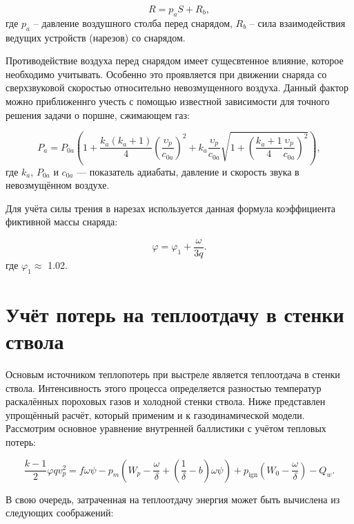 \documentclass[14pt, a4paper]{extreport} %
\begin{document}
\begin{equation}
R = p_a S + R_b,
\end{equation}
где $p_a$ -- давление воздушного столба перед снарядом, $R_b$ -- сила взаимодействия ведущих устройств (нарезов)
со снарядом.

Противодействие воздуха перед снарядом имеет сущесвтенное влияние, которое необходимо учитывать. Особенно это проявляется при движении снаряда 
со сверхзвуковой скоростью относительно невозмущенного воздуха. Данный фактор можно приближеннго учесть с помощью известной зависимости для точного решения задачи о поршне, сжимающем газ:

\begin{equation}
P_a = P_{0a} \left(1 + \frac{k_a(k_a+1)}{4} \left(\frac{\upsilon_p}{c_{0a}}\right)^2 + 
k_a \frac{\upsilon_p}{c_{0a}} \sqrt{1 + \left(\frac{k_a+1}{4} \frac{\upsilon_p}{c_{0a}}\right)^2} \right),
\end{equation}
где $k_a$, $P_{0a}$ и $c_{0a}$ — показатель адиабаты, давление и скорость звука в невозмущённом воздухе.

Для учёта силы трения в нарезах используется данная формула коэффициента фиктивной массы снаряда: 

\begin{equation}
\varphi = \varphi_1 + \frac{\omega}{3q}.
\label{eq:phi_equation}
\end{equation}
где $\varphi_1 \approx$  1.02.

\section{Учёт потерь на теплоотдачу в стенки ствола}

Основым источником теплопотерь при выстреле является теплоотдача в стенки ствола. Интенсивность этого процесса определяется разностью температур раскалённых пороховых газов и холодной стенки ствола. Ниже представлен упрощённый расчёт, который применим и к газодинамической модели.
Рассмотрим основное уравнение внутренней баллистики с учётом тепловых потерь:

\begin{equation}
\frac{k-1}{2} \varphi q v_p^2 = f \omega \psi - p_m \left( W_p - \frac{\omega}{\delta} + \left( \frac{1}{\delta} - b \right) \omega \psi \right) + p_{\text{ign}} \left( W_0 - \frac{\omega}{\delta} \right) - Q_w.
\end{equation}

В свою очередь, затраченная на теплоотдачу энергия может быть вычислена из следующих соображений:
\end{document}
